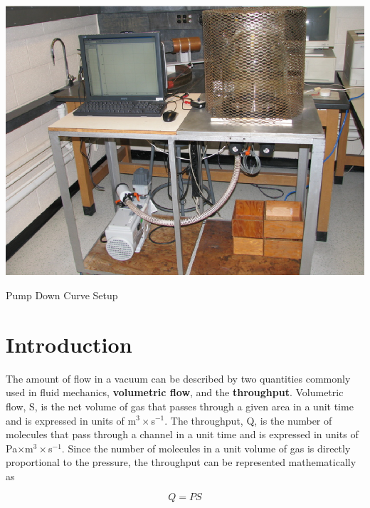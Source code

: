\begin{marginfigure}
\includegraphics{Pump-Down-Curves.eps}
\caption{Pump Down Curve Setup}
\label{fig:VACsetup6}
\end{marginfigure}

\section{Introduction}

The amount of flow in a vacuum can be described by two quantities commonly used in fluid mechanics, {\bf volumetric flow}, and the {\bf throughput}. Volumetric flow, S, is the net volume of gas that passes through a given area in a unit time and is expressed in units of m$^3\times$s$^{-1}$. The throughput, Q, is the number of molecules that pass through a channel in a unit time and is expressed in units of Pa$\times$m$^3\times$s$^{-1}$. Since the number of molecules in a unit volume of gas is directly proportional to the pressure, the throughput can be represented mathematically as

\begin{equation}
Q=PS
\label{equ:vac1}
\end{equation}

\begin{marginfigure}
\caption{}
\label{fig:vac5}
\end{marginfigure}


